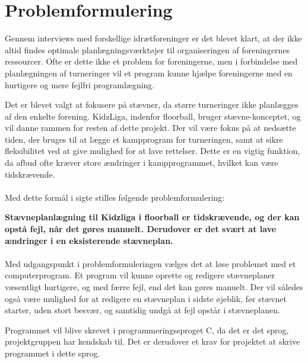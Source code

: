 \chapter{Problemformulering}\label{ch:chlabel}
Gennem interviews med forskellige idrætforeninger er det blevet klart, at der ikke altid findes optimale planlægningsværktøjer til organiseringen af foreningernes ressourcer. Ofte er dette ikke et problem for foreningerne, men i forbindelse med planlægningen af turneringer vil et program kunne hjælpe foreningerne med en hurtigere og mere fejlfri programlægning.
\par
Det er blevet valgt at fokusere på stævner, da større turneringer ikke planlægges af den enkelte forening. KidzLiga, indenfor floorball, bruger stævne-konceptet, og vil danne rammen for resten af dette projekt. Der vil være fokus på at nedsætte tiden, der bruges til at lægge et kampprogram for turneringen, samt at sikre fleksibilitet ved at give mulighed for at lave rettelser. Dette er en vigtig funktion, da afbud ofte kræver store ændringer i kampprogrammet, hvilket kan være tidskrævende.
\\\\
Med dette formål i sigte stilles følgende problemformulering:
\par
\textbf{Stævneplanlægning til Kidzliga i floorball er tidskrævende, og der kan opstå fejl, når det gøres manuelt. Derudover er det svært at lave ændringer i en eksisterende stævneplan.}
\\\\
Med udgangspunkt i problemformuleringen vælges det at løse problemet med et computerprogram. Et program vil kunne oprette og redigere stævneplaner væsentligt hurtigere, og med færre fejl, end det kan gøres manuelt. Der vil således også være mulighed for at redigere en stævneplan i sidste øjeblik, før stævnet starter, uden stort besvær, og samtidig undgå at fejl opstår i stævneplanen.
\par
Programmet vil blive skrevet i programmeringssproget C, da det er det sprog, projektgruppen har kendskab til. Det er derudover et krav for projektet at skrive programmet i dette sprog.





















